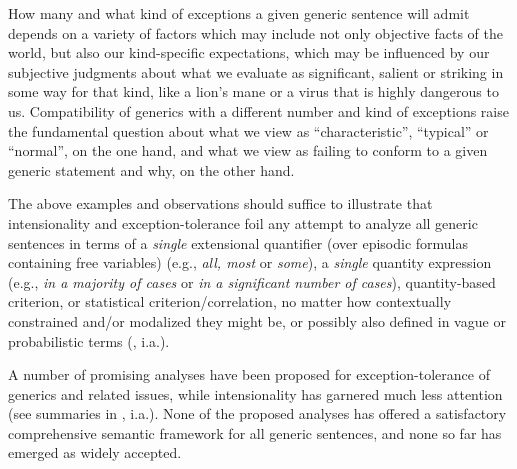 \documentclass[output=paper,colorlinks,citecolor=brown]{langscibook}
\begin{document}
\noindent How many and what kind of exceptions a given 
generic sentence will admit  depends on a variety of
factors which may include not only objective facts  of the world, but also our 
kind-specific expectations, which may be influenced
by our subjective judgments about what we 
evaluate as significant, salient or striking in some way for that kind,
like a lion's mane or a virus that is highly dangerous to us.
Compatibility of generics with a different number and 
kind of exceptions raise the 
fundamental question about what we
view as ``characteristic'', ``typical'' or ``normal'', on the one hand, and what we view 
as failing to conform to a given generic statement and why, on the other hand.

The above examples and observations should suffice to illustrate
that intensionality and exception-tolerance foil any attempt to analyze 
all generic sentences in 
terms of a \textit{single} extensional quantifier (over episodic formulas containing free variables)
(e.g., \textit{all, most} or \textit{some}), 
a \textit{single} quantity expression (e.g., \textit{in a majority of cases} or 
\textit{in a significant number of cases}), quantity-based
criterion, or statistical criterion/correlation, 
no matter how contextually constrained and/or modalized they might be, or possibly also 
defined in vague or probabilistic terms
(\citealt{pelletier1997generics,carlson2013,nickel2013,nickel2017}, i.a.). 

A number of promising analyses have been proposed for exception-tolerance of generics and related issues, while intensionality has garnered much less attention (see summaries in \citealt{krifka1995genericity,pelletier1997generics,MariBayssadeDelPrete2013genericity,nickel2017}, i.a.). None of the proposed analyses has offered a satisfactory comprehensive semantic 
framework for  
all generic sentences, and none so far has emerged as widely accepted. 
\end{document}
